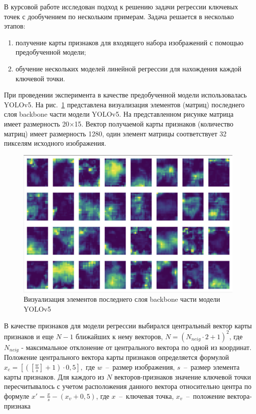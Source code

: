 \documentclass[a4paper,14pt]{article}
\begin{document}
    В курсовой работе исследован подход к решению задачи регрессии ключевых точек с дообучением по нескольким примерам.
    Задача решается в несколько этапов:
    \begin{enumerate}
        [1)]
        \itemsep0em
        \item получение карты признаков для входящего набора изображений с помощью предобученной модели;
        \item обучение нескольких моделей линейной регрессии для нахождения каждой ключевой точки.
    \end{enumerate}
    При проведении эксперимента в качестве предобученной модели использовалась YOLOv5.
    На рис.~\ref{fig:stage9_SPPF_features} представлена визуализация элементов (матриц) последнего слоя backbone части модели YOLOv5. На представленном рисунке матрица имеет размерность 20×15. Вектор получаемой карты признаков (количество матриц) имеет размерность 1280, один элемент матрицы соответствует 32 пикселям исходного изображения.
    \begin{figure}[H]
        \centering
        \includegraphics[width=0.7\linewidth]{images/stage9_SPPF_features}
        \caption{Визуализация элементов последнего слоя backbone части модели YOLOv5}
        \label{fig:stage9_SPPF_features}
    \end{figure}

    В качестве признаков для модели регрессии выбирался центральный вектор карты признаков и еще $N - 1$ ближайших к нему векторов, $N = (N_{neig} \cdot 2 + 1)^2$, где $N_{neig}$ - максимальное отклонение от центрального вектора по одной из координат.
    Положение центрального вектора карты признаков определяется формулой $x_c =\left[\left( [\frac{w}{s}]+1\right) \cdot 0,5\right],$ где $w$~--~размер изображения, $s$~--~размер элемента карты признаков.
    Для каждого из $N$ векторов-признаков значение ключевой точки пересчитывалось с учетом расположения данного вектора относительно центра по формуле $x' = \frac{x}{s} - (x_v + 0,5)$, где $x$~--~ключевая точка, $x_v$~--~положение вектора-признака
\end{document}
